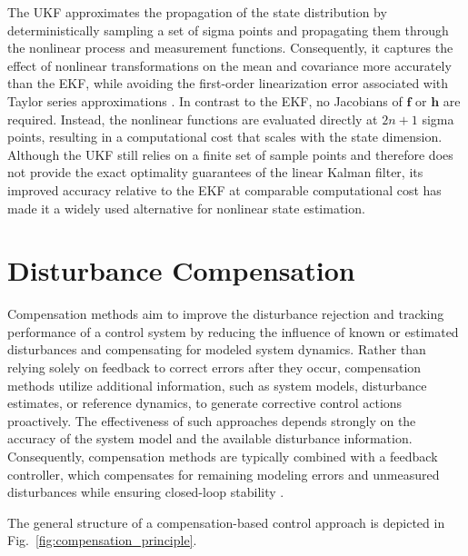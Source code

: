 The UKF approximates the propagation of the state distribution by deterministically sampling a set of sigma points and propagating them through the nonlinear process and measurement functions. Consequently, it captures the effect of nonlinear transformations on the mean and covariance more accurately than the EKF, while avoiding the first-order linearization error associated with Taylor series approximations \cite{Julier2004UKF}. In contrast to the EKF, no Jacobians of $\bm{f}$ or $\bm{h}$ are required. Instead, the nonlinear functions are evaluated directly at $2n+1$ sigma points, resulting in a computational cost that scales with the state dimension. 
Although the UKF still relies on a finite set of sample points and therefore does not provide the exact optimality guarantees of the linear Kalman filter, its improved accuracy relative to the EKF at comparable computational cost has made it a widely used alternative for nonlinear state estimation.





\section{Disturbance Compensation}
\label{sec:2.5DisturbanceCompensation}

Compensation methods aim to improve the disturbance rejection and tracking performance of a control system by reducing the influence of known or estimated disturbances and compensating for modeled system dynamics. Rather than relying solely on feedback to correct errors after they occur, compensation methods utilize additional information, such as system models, disturbance estimates, or reference dynamics, to generate corrective control actions proactively. The effectiveness of such approaches depends strongly on the accuracy of the system model and the available disturbance information. Consequently, compensation methods are typically combined with a feedback controller, which compensates for remaining modeling errors and unmeasured disturbances while ensuring closed-loop stability \cite{Astrom2010FeedbackSystems,Lunze2013Regelungstechnik2}.

The general structure of a compensation-based control approach is depicted in Fig.~\ref{fig:compensation_principle}.

